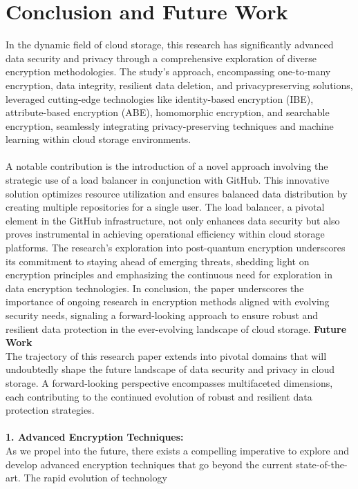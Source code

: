 \chapter{Conclusion and Future Work}
In the dynamic field of cloud storage, this research has significantly advanced data security and
privacy through a comprehensive exploration of diverse encryption methodologies. The study's
approach, encompassing one-to-many encryption, data integrity, resilient data deletion, and privacypreserving solutions, leveraged cutting-edge technologies like identity-based encryption (IBE),
attribute-based encryption (ABE), homomorphic encryption, and searchable encryption, seamlessly
integrating privacy-preserving techniques and machine learning within cloud storage environments.
\\
\\
A notable contribution is the introduction of a novel approach involving the strategic use of a load
balancer in conjunction with GitHub. This innovative solution optimizes resource utilization and
ensures balanced data distribution by creating multiple repositories for a single user. The load
balancer, a pivotal element in the GitHub infrastructure, not only enhances data security but also
proves instrumental in achieving operational efficiency within cloud storage platforms. The research's
exploration into post-quantum encryption underscores its commitment to staying ahead of emerging
threats, shedding light on encryption principles and emphasizing the continuous need for exploration
in data encryption technologies. In conclusion, the paper underscores the importance of ongoing
research in encryption methods aligned with evolving security needs, signaling a forward-looking
approach to ensure robust and resilient data protection in the ever-evolving landscape of cloud
storage.
\textbf{Future Work}\\
The trajectory of this research paper extends into pivotal domains that will undoubtedly shape the
future landscape of data security and privacy in cloud storage. A forward-looking perspective
encompasses multifaceted dimensions, each contributing to the continued evolution of robust and
resilient data protection strategies.
\\
\\
\textbf{1. Advanced Encryption Techniques: }\\
As we propel into the future, there exists a compelling imperative to explore and develop advanced
encryption techniques that go beyond the current state-of-the-art. The rapid evolution of technology
